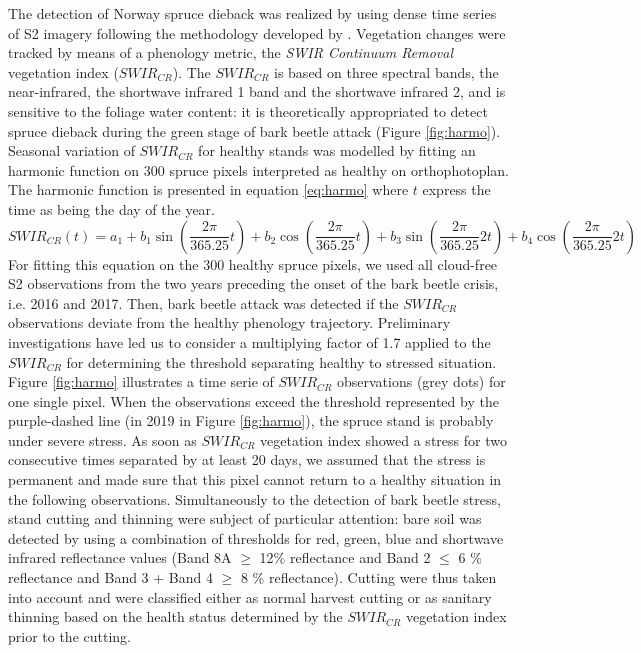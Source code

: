 \documentclass[3p,procedia]{elsarticle}
\begin{document}
The detection of Norway spruce dieback was realized by using dense time series of S2 imagery following the methodology developed by \cite{dutrieux_package_2021}.
Vegetation changes were tracked by means of a phenology metric, the \textit{SWIR Continuum Removal} vegetation index ($SWIR_{CR}$).
The $SWIR_{CR}$ is based on three spectral bands, the near-infrared, the shortwave infrared 1 band and the shortwave infrared 2, and is sensitive to the foliage water content: it is theoretically appropriated to detect spruce dieback during the green stage of bark beetle attack (Figure \ref{fig:harmo}).
Seasonal variation of $SWIR_{CR}$ for healthy stands was modelled by fitting an harmonic function on 300 spruce pixels interpreted as healthy on orthophotoplan. 
The harmonic function is presented in equation \ref{eq:harmo} where $t$ express the time as being the day of the year.
\begin{equation}\label{eq:harmo}
SWIR_{CR}(t) =   a_{1} + b_{1} \sin(\dfrac{2\pi}{365.25}t)+ b_{2} \cos(\dfrac{2\pi}{365.25}t)+ b_{3} \sin(\dfrac{2\pi}{365.25}2t)+ b_{4} \cos(\dfrac{2\pi}{365.25}2t)
\end{equation} 
For fitting this equation on the 300 healthy spruce pixels, we used all cloud-free S2 observations from the two years preceding the onset of the bark beetle crisis, i.e. 2016 and 2017.
Then, bark beetle attack was detected if the $SWIR_{CR}$ observations deviate from the healthy phenology trajectory. 
Preliminary investigations have led us to consider a multiplying factor of 1.7 applied to the $SWIR_{CR}$ for determining the threshold separating healthy to stressed situation.
Figure \ref{fig:harmo} illustrates a time serie of $SWIR_{CR}$ observations (grey dots) for one single pixel. 
When the observations exceed the threshold represented by the purple-dashed line (in 2019 in Figure \ref{fig:harmo}), the spruce stand is probably under severe stress.
As soon as $SWIR_{CR}$ vegetation index showed a stress for two consecutive times separated by at least 20 days, we assumed that the stress is permanent and made sure that this pixel cannot return to a healthy situation in the following observations.
Simultaneously  to the detection of bark beetle stress, stand cutting and thinning were subject of particular attention: 
bare soil was detected by using a combination of thresholds for red, green, blue and shortwave infrared reflectance values (Band 8A $\geq$ 12\% reflectance and Band 2 $\leq$ 6 \% reflectance and Band 3 + Band 4 $\geq$ 8 \% reflectance).
Cutting were thus taken into account and were classified either as normal harvest cutting or as sanitary thinning based on the health status determined by the $SWIR_{CR}$ vegetation index prior to the cutting.
\end{document}
